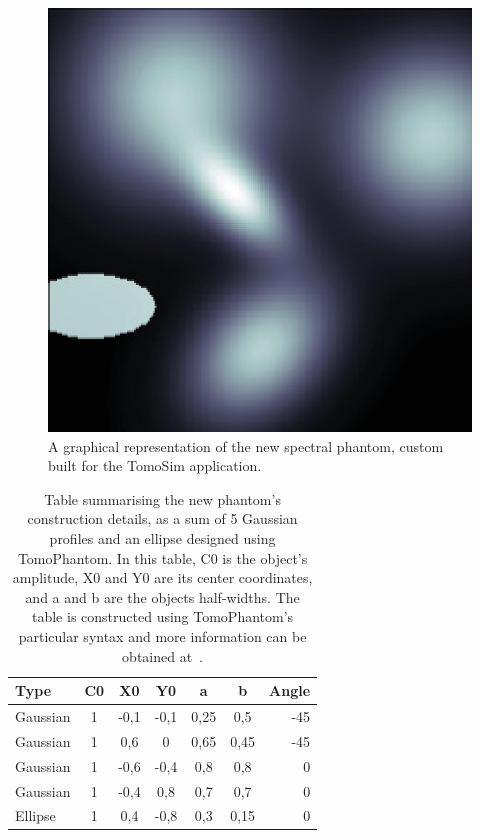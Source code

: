 \begin{figure}[htpb]
    \centering
    \includegraphics[width=.8\textwidth]{img/eps/original_phantom.eps}
    \caption{A graphical representation of the new spectral phantom,
    custom built for the TomoSim application.}
    \label{fig:new_phantom}
\end{figure}


\begin{table}[htpb]
    \centering
    \caption{Table summarising the new phantom's construction details,
    as a sum of 5 Gaussian profiles and an ellipse designed using
    TomoPhantom. In this table, C0 is the object's amplitude, X0 and Y0
    are its center coordinates, and a and b are the objects half-widths.
    The table is constructed using TomoPhantom's particular syntax and
    more information can be obtained at~\cite{Kazantsev2018}.}
    \label{tab:new_phantom}
    \begin{tabular}{@{}lcccccr@{}}
    \hline
    \textbf{Type} & \textbf{C0} & \textbf{X0} & \textbf{Y0} & \textbf{a}
                  & \textbf{b} & \textbf{\textbf{Angle}} \\ \hline
    Gaussian & 1 & -0,1 & -0,1 & 0,25 & 0,5 & -45 \\
    Gaussian & 1 & 0,6 & 0 & 0,65 & 0,45 & -45 \\
    Gaussian & 1 & -0,6 & -0,4 & 0,8 & 0,8 & 0 \\
    Gaussian & 1 & -0,4 & 0,8 & 0,7 & 0,7 & 0 \\
    Ellipse & 1 & 0,4 & -0,8 & 0,3 & 0,15 & 0 \\ \hline
    \end{tabular}
\end{table}

